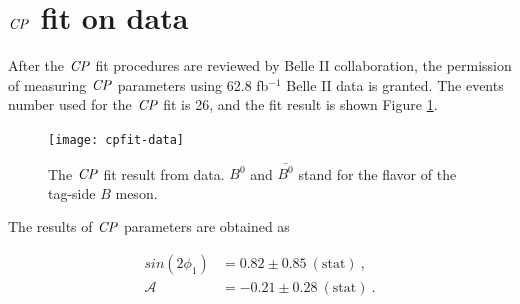 \section{$\it{CP}$ fit on data}
After the $\it{CP}$ fit procedures are reviewed by Belle II collaboration, the permission of measuring $\it{CP}$ parameters using 62.8 fb$^{-1}$ Belle II data is granted. The events number used for the $\it{CP}$ fit is 26, and the fit result is shown Figure \ref{fig:cpfit_data}.

\begin{figure}[htpb]
	\centering
	\texttt{[image: cpfit-data]}
	\caption{The $\it{CP}$ fit result from data. $B^0$ and $\bar{B^0}$ stand for the flavor of the tag-side $B$ meson.}
	\label{fig:cpfit_data}
\end{figure}

The results of $\it{CP}$ parameters are obtained as

\begin{equation}
\begin{split}
sin(2\phi_1) & = 0.82 \pm 0.85~(\text{stat})~, \\
\mathcal{A} & = -0.21 \pm 0.28~(\text{stat})~. \\
\end{split}
\end{equation} 


